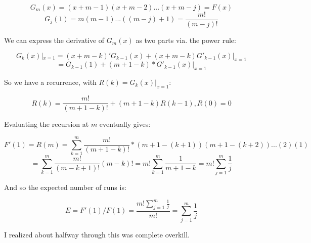 \documentclass{article}
\begin{document}
$$G_m(x) = (x+m-1)(x+m-2)...(x+m-j) = F(x)$$ 
$$G_j(1) = m(m-1)...( (m-j)+1) = \frac{m!}{(m-j)!}$$

We can express the derivative of $G_m(x)$ as two parts via. the power rule:

$$G_k(x)|_{x = 1} = (x+m-k)' G_{k-1}(x) + (x+m-k)G'_{k-1}(x)|_{x = 1}$$
$$= G_{k-1}(1) + (m+1-k)*G'_{k-1}(x)|_{x = 1}$$

So we have a recurrence, with $R(k) = G_{k}(x)|_{x = 1}$:

$$R(k) = \frac{m!}{(m+1-k)!} + (m+1-k)R(k-1),   R(0) = 0$$

Evaluating the recursion at $m$ eventually gives:

$$F'(1) = R(m) = \sum_{k = 1}^{m} \frac{m!}{(m+1-k)!}*(m+1-(k+1))(m+1-(k+2))...(2)(1)$$
$$= \sum_{k = 1}^{m} \frac{m!}{(m-k+1)!}(m-k)! = m!\sum_{k = 1}^{m}\frac{1}{m+1-k} = m!\sum_{j = 1}^{m}\frac{1}{j}$$

And so the expected number of runs is:

$$E = F'(1)/F(1) = \frac{m!\sum_{j = 1}^{m}\frac{1}{j}}{m!} = \sum_{j = 1}^{m}\frac{1}{j} $$

I realized about halfway through this was complete overkill. 
\end{document}
